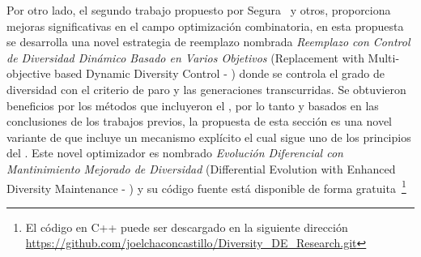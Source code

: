 %
Por otro lado, el segundo trabajo propuesto por Segura~\cite{segura2016novel} y otros, proporciona mejoras significativas en el campo optimización combinatoria, en esta propuesta se desarrolla una novel estrategia de reemplazo nombrada \textit{Reemplazo con Control de Diversidad Dinámico Basado en Varios Objetivos} (Replacement with Multi-objective based Dynamic Diversity Control - \RMDDC{}) donde se controla el grado de diversidad con el criterio de paro y las generaciones transcurridas.
%
Se obtuvieron beneficios por los métodos que incluyeron el \RMDDC{}, por lo tanto y basados en las conclusiones de los trabajos previos, la propuesta de esta sección es una novel variante de \DE{} que incluye un mecanismo explícito el cual sigue uno de los principios del \RMDDC{}.
%
Este novel optimizador es nombrado \textit{Evolución Diferencial con Mantinimiento Mejorado de Diversidad} (Differential Evolution with Enhanced Diversity Maintenance - \DEEDM{}) y su código fuente está disponible de forma gratuita~\footnote{El código en C++ puede ser descargado en la siguiente dirección \url{https://github.com/joelchaconcastillo/Diversity\_DE\_Research.git} }


